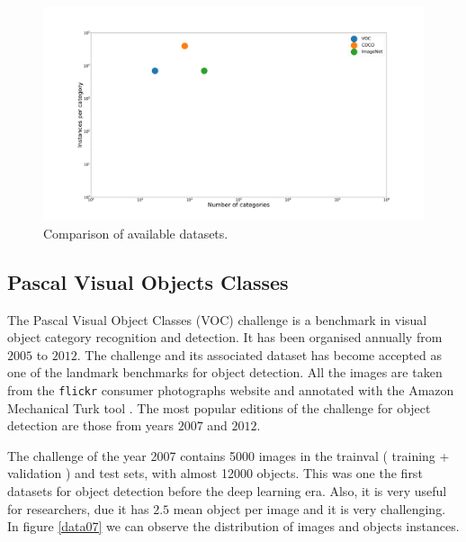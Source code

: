 \begin{figure}[H]
\centering         
\includegraphics[width=15cm]{datasets/sdad2.png}
\caption{Comparison of available datasets.} \label{instancesCategorydata}
\end{figure}



\subsection{Pascal Visual Objects Classes}

The Pascal Visual Object Classes (VOC) challenge  \cite{voc07} is a benchmark in visual object category recognition and detection. It has been organised annually from $2005$ to $2012$. The challenge and its associated dataset has become accepted as one of the landmark benchmarks for object detection. All the images are taken from the \texttt{flickr} consumer photographs website and annotated with the Amazon Mechanical Turk tool \cite{amazonturk}. The most popular editions of the challenge for object detection are those from years $2007$ and $2012$.

The challenge of the year 2007 \cite{voc07website} contains 5000 images in the trainval ( training + validation ) and test sets, with almost 12000 objects. This was one the first datasets for object detection before the deep learning era. Also, it is very useful for researchers, due it has $2.5$ mean object per image and it is very challenging. In figure \ref{data07} we can observe the distribution of images and objects instances. 

